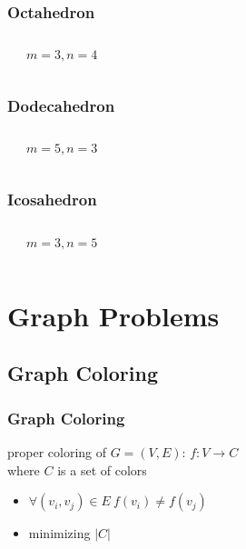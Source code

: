 \documentclass[dvipsnames]{beamer}
\begin{document}
\begin{frame}
  \frametitle{Octahedron}

  \begin{columns}
    \begin{center}
    \end{center}

    \begin{center}

      $m=3, n=4$
    \end{center}
  \end{columns}
\end{frame}

\begin{frame}
  \frametitle{Dodecahedron}

  \begin{columns}
    \begin{center}
    \end{center}

    \begin{center}

      $m=5, n=3$
    \end{center}
  \end{columns}
\end{frame}

\begin{frame}
  \frametitle{Icosahedron}

  \begin{columns}
    \begin{center}
    \end{center}

    $m=3, n=5$
  \end{columns}
\end{frame}

\section{Graph Problems}

\subsection{Graph Coloring}

\begin{frame}
  \frametitle{Graph Coloring}

  \begin{definition}
    \alert{proper coloring} of $G=(V,E)$: $f: V \rightarrow C$\\
      where $C$ is a set of colors
    \begin{itemize}
      \item $\forall (v_i,v_j) \in E~f(v_i) \neq f(v_j)$
      \item minimizing $|C|$
    \end{itemize}
  \end{definition}
\end{frame}
\end{document}
